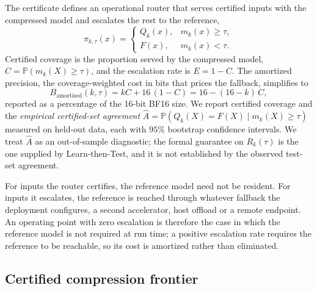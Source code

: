 \documentclass[pdflatex,sn-mathphys-num]{sn-jnl}%
\newcommand{\Prob}{\mathbb{P}}
\theoremstyle{thmstyleone}%
\theoremstyle{thmstyletwo}%
\theoremstyle{thmstylethree}%
\begin{document}
The certificate defines an operational router that serves certified inputs with the compressed
model and escalates the rest to the reference,
\begin{equation}
\pi_{k,\tau}(x)=
\begin{cases}
Q_k(x), & m_k(x)\ge\tau,\\
F(x), & m_k(x)<\tau.
\end{cases}
\end{equation}
Certified coverage is the proportion served by the compressed model, $C=\Prob(m_k(X)\ge\tau)$, and
the escalation rate is $E=1-C$. The amortized precision, the coverage-weighted cost in bits that
prices the fallback, simplifies to
\begin{equation}
B_{\mathrm{amortised}}(k,\tau)=kC+16\,(1-C)=16-(16-k)\,C,
\end{equation}
reported as a percentage of the 16-bit BF16 size. We report certified coverage and the
\emph{empirical certified-set agreement} $\widehat A=\Prob(Q_k(X)=F(X)\mid m_k(X)\ge\tau)$ measured
on held-out data, each with $95\%$ bootstrap confidence intervals. We treat $\widehat A$ as an
out-of-sample diagnostic; the formal guarantee on $R_k(\tau)$ is the one supplied by
Learn-then-Test, and it is not established by the observed test-set agreement.
 
For inputs the router certifies, the reference model need not be resident. For inputs it escalates,
the reference is reached through whatever fallback the deployment configures, a second accelerator,
host offload or a remote endpoint. An operating point with zero escalation is therefore the case in
which the reference model is not required at run time; a positive escalation rate requires the
reference to be reachable, so its cost is amortized rather than eliminated.
 
\subsection*{Certified compression frontier}
 
\end{document}
